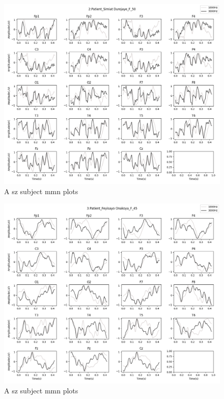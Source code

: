 \documentclass[10pt]{article}
\begin{document}
\begin{figure}[H]
  \includegraphics[width=16cm]{../../../data_analysis_results/MMN/time_series/Patient/2.png}
  \caption{A \gls{sz} subject \gls{mmn} plots}
\end{figure}
\begin{figure}[H]
  \includegraphics[width=16cm]{../../../data_analysis_results/MMN/time_series/Patient/3.png}
  \caption{A \gls{sz} subject \gls{mmn} plots}
\end{figure}
\end{document}
